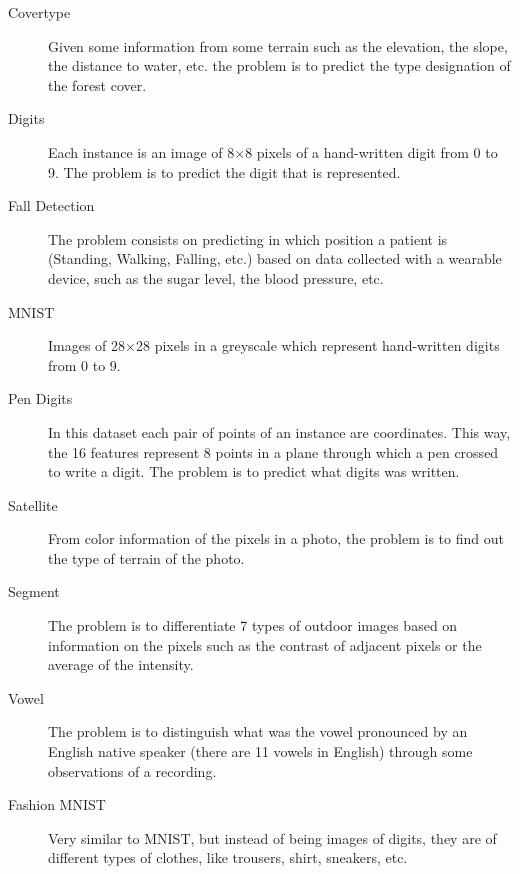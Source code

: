 \begin{pre-delivery}
  \begin{description}
    \item[Covertype] Given some information from some terrain such as the
    elevation, the slope, the distance to water, etc. the problem is to predict
    the type designation of the forest cover.
    \item[Digits] Each instance is an image of 8$\times$8 pixels of a
    hand-written digit from 0 to 9. The problem is to predict the
    digit that is represented.
    \item[Fall Detection] The problem consists on predicting in which position
    a patient is (Standing, Walking, Falling, etc.) based on data collected
    with a wearable device, such as the sugar level, the blood pressure, etc.
    \item[MNIST] Images of 28$\times$28 pixels in a greyscale which represent
    hand-written digits from 0 to 9.
    \item[Pen Digits] In this dataset each pair of points of an instance are
    coordinates. This way, the 16 features represent 8 points in a plane through
    which a pen crossed to write a digit. The problem is to predict what
    digits was written.
    \item[Satellite] From color information of the pixels in a photo, the problem
    is to find out the type of terrain of the photo.
    \item[Segment] The problem is to differentiate 7 types of outdoor images
    based on information on the pixels such as the contrast of adjacent pixels
    or the average of the intensity.
    \item[Vowel] The problem is to distinguish what was the vowel pronounced
    by an English native speaker (there are 11 vowels in English) through some
    observations of a recording.
    \item[Fashion MNIST] Very similar to MNIST, but instead of being images
    of digits, they are of different types of clothes, like trousers, shirt,
    sneakers, etc.
  \end{description}
\end{pre-delivery}
